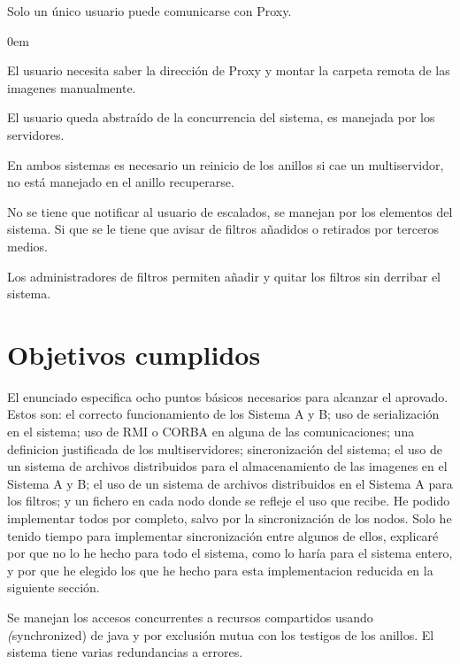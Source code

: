 \documentclass{article}
\begin{document}
\begin{flushleft}
\begin{description}
			\end{description}
		\begin{description}
		\addtolength{\itemindent}{0.5cm}
		\item[Concurrencia:] Solo un único usuario puede comunicarse con Proxy.
		\item[Transparencia]
			\end{description}
			\begin{description}
				\addtolength{\itemindent}{1cm}
				\itemsep0em 
					\item[Acceso y ubicación:] El usuario necesita saber la dirección de Proxy y montar la carpeta remota de las imagenes manualmente.
					\item[Concurrencia:] El usuario queda abstraído de la concurrencia del sistema, es manejada por los servidores.
					\item[Replicación:] En ambos sistemas es necesario un reinicio de los anillos si cae un multiservidor, no está manejado en el anillo recuperarse.
					\item[Escalado y prestaciones:] No se tiene que notificar al usuario de escalados, se manejan por los elementos del sistema. Si que se le tiene que avisar de filtros añadidos o retirados por terceros medios.
					\item[Movilidad:] Los administradores de filtros permiten añadir y quitar los filtros sin derribar el sistema.
	\end{description}
	\section{Objetivos cumplidos}
	El enunciado especifica ocho puntos básicos necesarios para alcanzar el aprovado. Estos son: el correcto funcionamiento de los Sistema A y B; uso de serialización en el sistema; uso de RMI o CORBA en alguna de las comunicaciones; una definicion justificada de los multiservidores; sincronización del sistema; el uso de un sistema de archivos distribuidos para el almacenamiento de las imagenes en el Sistema A y B; el uso de un sistema de archivos distribuidos en el Sistema A para los filtros; y un fichero en cada nodo donde se refleje el uso que recibe. He podido implementar todos por completo, salvo por la sincronización de los nodos. Solo he tenido tiempo para implementar sincronización entre algunos de ellos, explicaré por que no lo he hecho para todo el sistema, como lo haría para el sistema entero, y por que he elegido los que he hecho para esta implementacion reducida en la siguiente sección.
	\linebreak
		
	Se manejan los accesos concurrentes a recursos compartidos usando \textit(synchronized) de java y por exclusión mutua con los testigos de los anillos. El sistema tiene varias redundancias a errores.
\end{flushleft}
\end{document}
